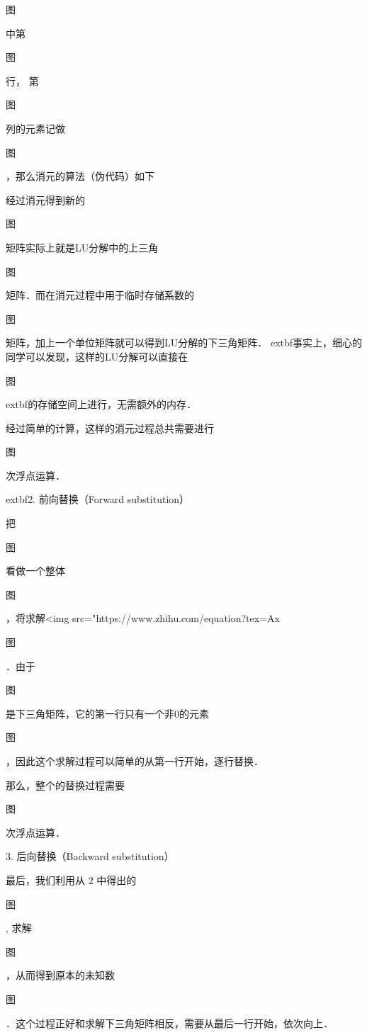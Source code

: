 图

 中第

图

 行， 第

图

 列的元素记做

图

 ，那么消元的算法（伪代码）如下

经过消元得到新的

图

 矩阵实际上就是LU分解中的上三角

图

 矩阵．而在消元过程中用于临时存储系数的

图

 矩阵，加上一个单位矩阵就可以得到LU分解的下三角矩阵．	extbf{事实上，细心的同学可以发现，这样的LU分解可以直接在}

图

 	extbf{的存储空间上进行，无需额外的内存}．

经过简单的计算，这样的消元过程总共需要进行

图

 次浮点运算．

	extbf{2. 前向替换（Forward substitution）}

把

图

 看做一个整体

图

 ，将求解<img src="https://www.zhihu.com/equation?tex=Ax%

图

 ．由于

图

 是下三角矩阵，它的第一行只有一个非0的元素

图

 ，因此这个求解过程可以简单的从第一行开始，逐行替换．

那么，整个的替换过程需要

图

 次浮点运算．

3. 后向替换（Backward substitution）

最后，我们利用从 2 中得出的

图

 , 求解

图

 ，从而得到原本的未知数

图

 ．这个过程正好和求解下三角矩阵相反，需要从最后一行开始，依次向上．

